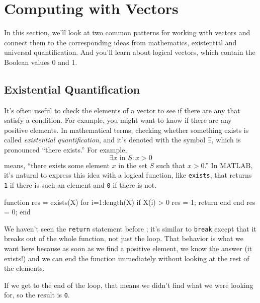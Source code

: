 \section{Computing with Vectors}

In this section, we'll look at two common patterns for working with vectors and connect them to the corresponding ideas from mathematics, existential and universal quantification.  And you'll learn about logical vectors, which contain the Boolean values 0 and 1.

\subsection{Existential Quantification}


It's often useful to check the elements of a vector to see if there
are any that satisfy a condition.  For example, you might want to
know if there are any positive elements.  In mathematical terms, checking whether something exists is called \emph{existential quantification}, and it's denoted with
the symbol $\exists$, which is pronounced ``there exists.''  For example,
%
\[ \exists x \mbox{~in~} S: x>0  \]
%
means, ``there exists some element $x$ in the set $S$ such that
$x>0$.''  In MATLAB, it's natural to express this idea with a logical
function, like \lstinline{exists}, that returns \lstinline{1} if there is such an
element and \lstinline{0} if there is not.

\begin{code}
function res = exists(X)
    for i=1:length(X)
        if X(i) > 0
            res = 1;
            return
        end
    end
    res = 0;
end
\end{code}

We haven't seen the \lstinline{return} statement before ; it's similar
to \lstinline{break} except that it breaks out of the whole function, not
just the loop.  That behavior is what we want here because as soon
as we find a positive element, we know the answer (it exists!) and
we can end the function immediately without looking at the rest
of the elements.


If we get to the end of the loop, that means we didn't find what
we were looking for, so the result is \lstinline{0}.

